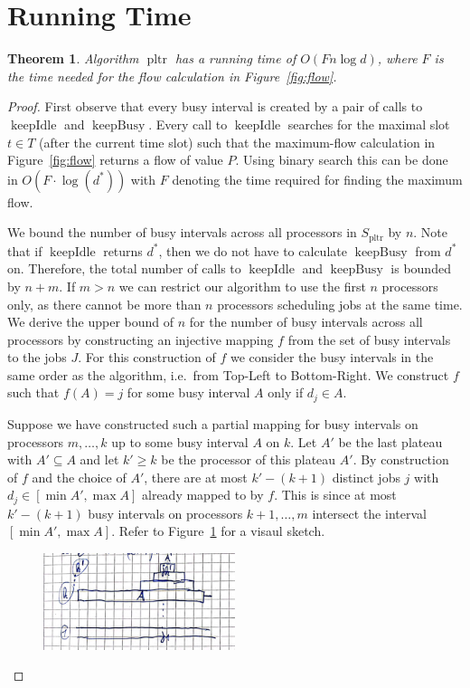 \documentclass[a4paper]{article}
\DeclareMathOperator{\pltr}{pltr}
\DeclareMathOperator{\keepidle}{keepIdle}
\DeclareMathOperator{\keepbusy}{keepBusy}
\newtheorem{theorem}{Theorem}
\begin{document}
\section{Running Time}
\begin{theorem}
  Algorithm $\pltr$ has a running time of $O(F n \log d)$, where $F$ is the time needed for the flow calculation in Figure~\ref{fig:flow}.
\end{theorem}
\begin{proof}
  First observe that every busy interval is created by a pair of calls to $\keepidle$ and $\keepbusy$.
  Every call to $\keepidle$ searches for the maximal slot $t \in T$ (after the current time slot) such that the maximum-flow calculation in Figure~\ref{fig:flow} returns a flow of value $P$.
  Using binary search this can be done in $O(F \cdot \log(d^*))$ with $F$ denoting the time required for finding the maximum flow.

  We bound the number of busy intervals across all processors in $S_{\pltr}$ by $n$.
  Note that if $\keepidle$ returns $d^*$, then we do not have to calculate $\keepbusy$ from $d^*$ on.
  Therefore, the total number of calls to $\keepidle$ and $\keepbusy$ is bounded by $n + m$.
  If $m > n$ we can restrict our algorithm to use the first $n$ processors only, as there cannot be more than $n$ processors scheduling jobs at the same time.
  We derive the upper bound of $n$ for the number of busy intervals across all processors by constructing an injective mapping $f$ from the set of busy intervals to the jobs $J$.
  For this construction of $f$ we consider the busy intervals in the same order as the algorithm, i.e.\ from Top-Left to Bottom-Right.
  We construct $f$ such that $f(A) = j$ for some busy interval $A$ only if $d_j \in A$.

  Suppose we have constructed such a partial mapping for busy intervals on processors $m, \ldots, k$ up to some busy interval $A$ on $k$.
  Let $A'$ be the last plateau with $A' \subseteq A$ and let $k' \geq k$ be the processor of this plateau $A'$.
  By construction of $f$ and the choice of $A'$, there are at most $k' - (k + 1)$ distinct jobs $j$ with $d_j \in [\min A', \max A]$ already mapped to by $f$.
  This is since at most $k' - (k+1)$ busy intervals on processors $k+1, \ldots, m$ intersect the interval $[\min A', \max A]$.
  Refer to Figure~\ref{fig:running_time} for a visaul sketch.

  \begin{figure}[H]
    \centering
    \includegraphics[width=0.5\textwidth]{graphics/sketches/running_time.png}\label{fig:running_time}
    \caption{}
  \end{figure}


\end{proof}
\end{document}
